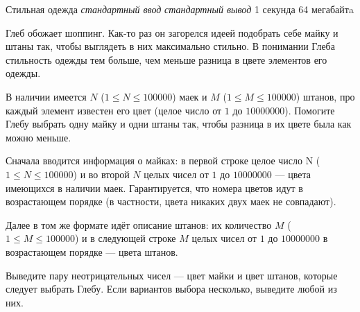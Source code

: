 \begin{problem}%
{Стильная одежда}%
{\textsl{стандартный ввод}}%
{\textsl{стандартный вывод}}%
{1 секунда}%
{64 мегабайтa}{}

Глеб обожает шоппинг. Как-то раз он загорелся идеей подобрать себе майку и штаны так, чтобы выглядеть в них максимально стильно. В понимании Глеба стильность одежды тем больше, чем меньше разница в цвете элементов его одежды.

В наличии имеется $N$ ($1 \le N \le 100000$) маек и $M$ ($1 \le M \le 100000$) штанов, про каждый элемент известен его цвет (целое число от $1$ до $10000000$). Помогите Глебу выбрать одну майку и одни штаны так, чтобы разница в их цвете была как можно меньше.

\InputFile

Сначала вводится информация о майках: в первой строке целое число N ($1 \le N \le 100000$) и во второй $N$ целых чисел от $1$ до $10000000$ — цвета имеющихся в наличии маек. Гарантируется, что номера цветов идут в возрастающем порядке (в частности, цвета никаких двух маек не совпадают).

Далее в том же формате идёт описание штанов: их количество $M$ ($1 \le M \le 100000$) и в следующей строке $M$ целых чисел от $1$ до $10000000$ в возрастающем порядке — цвета штанов.

\OutputFile

Выведите пару неотрицательных чисел — цвет майки и цвет штанов, которые следует выбрать Глебу. Если вариантов выбора несколько, выведите любой из них.

\Examples

\begin{example}
%
%
\end{example}
\end{problem}

